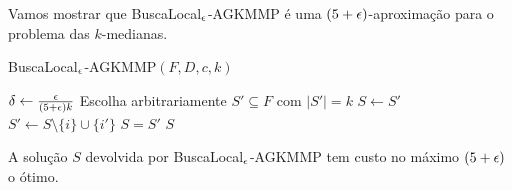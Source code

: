 Vamos mostrar que {\sc BuscaLocal$_\epsilon$-AGKMMP} é uma $(5 + \epsilon)$-aproximação para o problema das $k$-medianas.
\begin{algorithm}[H]
    \caption{\sc BuscaLocal$_\epsilon$-AGKMMP$(F,D,c,k)$}
    \begin{algorithmic}[1]
        \State $\delta \gets \frac{\epsilon}{(5+\epsilon)k}$
        \State Escolha arbitrariamente $S' \subseteq F$ com $|S'| = k$
        \Repeat
        \State $S\gets S'$
        \State $S' \gets S \setminus \{i\} \cup \{i'\}$
        \EndIf
        \Until $S=S'$
        \State \Return $S$
    \end{algorithmic}
\end{algorithm}

\begin{theorem}
    A solução $S$ devolvida por {\sc BuscaLocal$_\epsilon$-AGKMMP} tem custo no máximo $(5+\epsilon)$ o ótimo.
\end{theorem}

